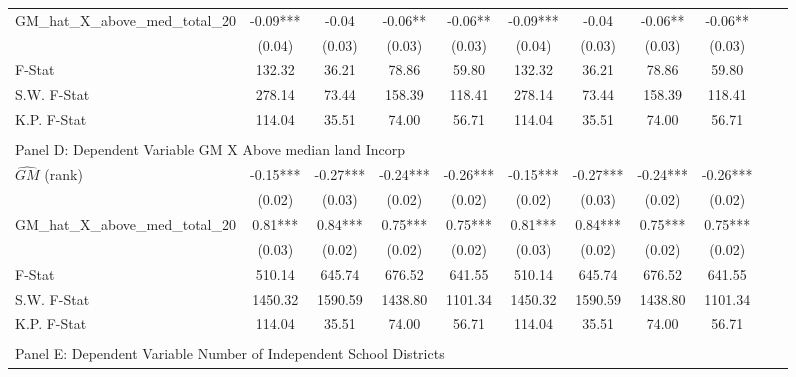 \begin{table}[htbp]
\begin{threeparttable}
\begin{tabular}{l*{10}{c}}
\addlinespace
GM\_hat\_X\_above\_med\_total\_20&      -0.09***&      -0.04   &      -0.06** &      -0.06** &      -0.09***&      -0.04   &      -0.06** &      -0.06** \\
                &     (0.04)   &     (0.03)   &     (0.03)   &     (0.03)   &     (0.04)   &     (0.03)   &     (0.03)   &     (0.03)   \\
\midrule
F-Stat          &     132.32   &      36.21   &      78.86   &      59.80   &     132.32   &      36.21   &      78.86   &      59.80   \\
S.W. F-Stat     &     278.14   &      73.44   &     158.39   &     118.41   &     278.14   &      73.44   &     158.39   &     118.41   \\
K.P. F-Stat     &     114.04   &      35.51   &      74.00   &      56.71   &     114.04   &      35.51   &      74.00   &      56.71   \\
\cmidrule[\heavyrulewidth](lr){1-9} \\ \cmidrule[\heavyrulewidth](lr){1-9}
\multicolumn{8}{l}{Panel D: Dependent Variable GM X Above median land Incorp}\\
\cmidrule(lr){1-9}
$\hat{GM}$ (rank)&      -0.15***&      -0.27***&      -0.24***&      -0.26***&      -0.15***&      -0.27***&      -0.24***&      -0.26***\\
                &     (0.02)   &     (0.03)   &     (0.02)   &     (0.02)   &     (0.02)   &     (0.03)   &     (0.02)   &     (0.02)   \\
\addlinespace
GM\_hat\_X\_above\_med\_total\_20&       0.81***&       0.84***&       0.75***&       0.75***&       0.81***&       0.84***&       0.75***&       0.75***\\
                &     (0.03)   &     (0.02)   &     (0.02)   &     (0.02)   &     (0.03)   &     (0.02)   &     (0.02)   &     (0.02)   \\
\midrule
F-Stat          &     510.14   &     645.74   &     676.52   &     641.55   &     510.14   &     645.74   &     676.52   &     641.55   \\
S.W. F-Stat     &    1450.32   &    1590.59   &    1438.80   &    1101.34   &    1450.32   &    1590.59   &    1438.80   &    1101.34   \\
K.P. F-Stat     &     114.04   &      35.51   &      74.00   &      56.71   &     114.04   &      35.51   &      74.00   &      56.71   \\
\cmidrule[\heavyrulewidth](lr){1-9} \\ \cmidrule[\heavyrulewidth](lr){1-9}
\multicolumn{8}{l}{Panel E: Dependent Variable Number of Independent School Districts}\\

\end{tabular}
\end{threeparttable}
\end{table}
